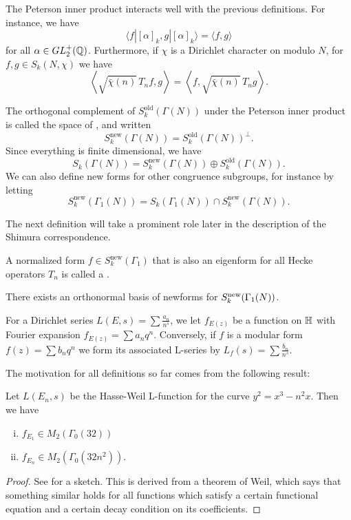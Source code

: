 \documentclass[12pt, a4paper]{report}
\begin{document}
The Peterson inner product interacts well with the previous definitions. For
instance, we have
\[\langle f | [\alpha]_k, g | [\alpha]_k \rangle = \langle f,g \rangle\]
for all $\alpha \in GL_2^+({\mathbb Q})$. Furthermore, if $\chi$ is a Dirichlet
character on modulo $N$, for $f,g \in S_k(N, \chi)$ we have
\[\left\langle \sqrt{\bar{\chi}(n)} \,T_n f, g \right\rangle = 
\left\langle f, \sqrt{\bar{\chi}(n)}\, T_n g \right\rangle.\]

\begin{defn}
  The orthogonal complement of $S_k^{\text{old}}(\Gamma(N))$ under the Peterson
  inner product is called the space of , and
  written
  \[S_k^{\text{new}}(\Gamma(N)) = S_k^{\text{old}}(\Gamma(N))^\perp.\]
  Since everything is finite dimensional, we have
  \[S_k(\Gamma(N)) = S_k^{\text{new}}(\Gamma(N)) \oplus S_k^{\text{old}}(\Gamma(N)).\]
  We can also define new forms for other congruence subgroups, for instance by
  letting
  \[S_k^{\text{new}}(\Gamma_1(N)) = S_k(\Gamma_1(N)) \cap
  S_k^{\text{new}}(\Gamma(N)).\]
\end{defn}

The next definition will take a prominent role later in the description of the
Shimura correspondence.

\begin{defn}
  A normalized form $f \in S_k^{\text{new}}(\Gamma_1)$ that is also an eigenform for all
  Hecke operators $T_n$ is called a . 
\end{defn}

\begin{prop}
  There exists an orthonormal basis of newforms for $S_k^{\textnormal{new}}(\Gamma_1(N))$.
\end{prop}

For a Dirichlet series $L(E, s) = \sum \frac{a_n}{n^s}$, we let $f_{E(z)}$ be a
function on $\mathbb{H}$ with Fourier expansion $f_{E(z)} = \sum a_n q^n.$ Conversely,
if $f$ is a modular form $f(z) = \sum b_n q^n$ we form its associated L-series
by $L_f(s) = \sum \frac{b_n}{n^s}.$

The motivation for all definitions so far comes from the following result:

\begin{prop} \label{Llevel}
  Let $L(E_n,s)$ be the Hasse-Weil L-function for the curve $y^2 = x^3-n^2x$.
  Then we have
  \begin{enumerate}[(i)]
  \item $f_{E_1} \in M_2(\Gamma_0(32))$
  \item $f_{E_n} \in M_2(\Gamma_0(32n^2))$.
  \end{enumerate}
\end{prop}
\begin{proof}
  See \cite[Pages 140-143]{koblitz} for a sketch. This is derived from a theorem
  of Weil, which says that something similar holds for all functions which satisfy
  a certain functional equation and a certain decay condition on its
  coefficients.
\end{proof}
\end{document}
